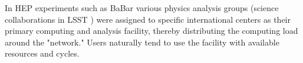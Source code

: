 In HEP experiments such as  BaBar various physics analysis groups (science collaborations in LSST ) were assigned to specific international centers as their primary computing and analysis facility, thereby distributing the computing load around the "network." Users naturally tend to use the facility with available resources and cycles.
~


